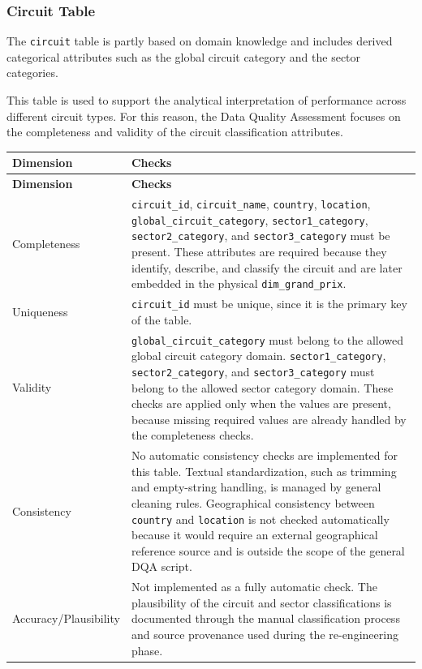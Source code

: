 \documentclass[a4paper,11pt]{article}
\begin{document}
	\subsubsection{Circuit Table}
	
	The \texttt{circuit} table is partly based on domain knowledge and includes
	derived categorical attributes such as the global circuit category and the sector
	categories.
	
	This table is used to support the analytical interpretation of performance across
	different circuit types. For this reason, the Data Quality Assessment focuses on
	the completeness and validity of the circuit classification attributes.
	
	\begin{longtable}{p{3.5cm}p{11cm}}
		\toprule
		\textbf{Dimension} & \textbf{Checks} \\
		\midrule
		\endfirsthead
		
		\toprule
		\textbf{Dimension} & \textbf{Checks} \\
		\midrule
		\endhead
		
		Completeness
		& \texttt{circuit\_id}, \texttt{circuit\_name}, \texttt{country},
		\texttt{location}, \texttt{global\_circuit\_category},
		\texttt{sector1\_category}, \texttt{sector2\_category}, and
		\texttt{sector3\_category} must be present. These attributes are required
		because they identify, describe, and classify the circuit and are later embedded
		in the physical \texttt{dim\_grand\_prix}. \\
		\midrule
		
		Uniqueness
		& \texttt{circuit\_id} must be unique, since it is the primary key of the table. \\
		\midrule
		
		Validity
		& \texttt{global\_circuit\_category} must belong to the allowed global circuit
		category domain. \texttt{sector1\_category}, \texttt{sector2\_category}, and
		\texttt{sector3\_category} must belong to the allowed sector category domain.
		These checks are applied only when the values are present, because missing
		required values are already handled by the completeness checks. \\
		\midrule
		
		Consistency
		& No automatic consistency checks are implemented for this table. Textual
		standardization, such as trimming and empty-string handling, is managed by
		general cleaning rules. Geographical consistency between \texttt{country} and
		\texttt{location} is not checked automatically because it would require an
		external geographical reference source and is outside the scope of the general
		DQA script. \\
		\midrule
		
		Accuracy/Plausibility
		& Not implemented as a fully automatic check. The plausibility of the circuit
		and sector classifications is documented through the manual classification
		process and source provenance used during the re-engineering phase. \\
		\midrule
		
		\bottomrule
	\end{longtable}
	
\end{document}
